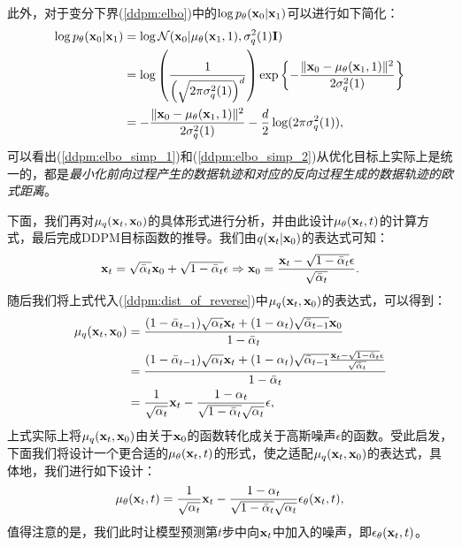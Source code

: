 \documentclass[11pt,a4paper,UTF8]{ctexart}
\begin{document}
此外，对于变分下界(\ref{ddpm:elbo})中的$\log p_{\theta}(\mathbf{x}_0|\mathbf{x}_1)$可以进行如下简化：
\begin{align}
\begin{split}
\log p_{\theta}(\mathbf{x}_0|\mathbf{x}_1) &= \log \mathcal{N}(\mathbf{x}_0| \mu_{\theta}(\mathbf{x}_1,1),\sigma_q^2(1)\mathbf{I}) \\
&= \log \left( \frac{1}{\left(\sqrt{2\pi\sigma_q^2(1)} \right)^d} \right)\exp \left\{-\frac{\|\mathbf{x}_0 -\mu_{\theta}(\mathbf{x}_1,1) \|^2}{2\sigma_q^2(1)} \right\} \\
&= -\frac{\|\mathbf{x}_0 -\mu_{\theta}(\mathbf{x}_1,1) \|^2}{2\sigma_q^2(1)} -\frac{d}{2}\log (2\pi\sigma_q^2(1)),
\label{ddpm:elbo_simp_2}
\end{split}
\end{align}
可以看出(\ref{ddpm:elbo_simp_1})和(\ref{ddpm:elbo_simp_2})从优化目标上实际上是统一的，都是\emph{最小化前向过程产生的数据轨迹和对应的反向过程生成的数据轨迹的欧式距离}。

下面，我们再对$\mu_q(\mathbf{x}_t,\mathbf{x}_0)$的具体形式进行分析，并由此设计$\mu_{\theta}(\mathbf{x}_t,t)$的计算方式，最后完成DDPM目标函数的推导。我们由$q(\mathbf{x}_t|\mathbf{x}_0)$的表达式可知：
\begin{equation*}
    \mathbf{x}_t =\sqrt{\bar{\alpha}_t}\mathbf{x}_0 + \sqrt{1-\bar{\alpha}_t}\epsilon \Rightarrow  \mathbf{x}_0 =\frac{\mathbf{x}_t - \sqrt{1-\bar{\alpha}_t}\epsilon}{\sqrt{\bar{\alpha}_t}}.
\end{equation*}
随后我们将上式代入(\ref{ddpm:dist_of_reverse})中$\mu_q(\mathbf{x}_t,\mathbf{x}_0)$的表达式，可以得到：
\begin{align}
\begin{split}
    \mu_q(\mathbf{x}_t,\mathbf{x}_0) &= \frac{(1-\bar{\alpha}_{t-1})\sqrt{\alpha_t}\mathbf{x}_t +(1-\alpha_t)\sqrt{\bar{\alpha}_{t-1}}\mathbf{x}_0 }{1-\bar{\alpha}_t} \\
    &= \frac{(1-\bar{\alpha}_{t-1})\sqrt{\alpha_t}\mathbf{x}_t +(1-\alpha_t)\sqrt{\bar{\alpha}_{t-1}}\frac{\mathbf{x}_t - \sqrt{1-\bar{\alpha}_t}\epsilon}{\sqrt{\bar{\alpha}_t}} }{1-\bar{\alpha}_t}\\
    &= \frac{1}{\sqrt{\alpha_t}}\mathbf{x}_t - \frac{1-\alpha_t}{\sqrt{1-\bar{\alpha}_t}\sqrt{\alpha_t}}\epsilon,
\end{split}
\label{ddpm:mu_q}
\end{align}
上式实际上将$\mu_q(\mathbf{x}_t,\mathbf{x}_0)$由关于$\mathbf{x}_0$的函数转化成关于高斯噪声$\epsilon$的函数。受此启发，下面我们将设计一个更合适的$\mu_{\theta}(\mathbf{x}_t,t)$的形式，使之适配$\mu_q(\mathbf{x}_t,\mathbf{x}_0)$的表达式，具体地，我们进行如下设计：
\begin{equation}
\mu_{\theta}(\mathbf{x}_t,t)=\frac{1}{\sqrt{\alpha_t}}\mathbf{x}_t - \frac{1-\alpha_t}{\sqrt{1-\bar{\alpha}_t}\sqrt{\alpha_t}}\epsilon_{\theta}(\mathbf{x}_t,t),
\label{ddpm:mu_theta}
\end{equation}
值得注意的是，我们此时让模型预测第$t$步中向$\mathbf{x}_t$中加入的噪声，即$\epsilon_{\theta}(\mathbf{x}_t,t)$。
\end{document}
